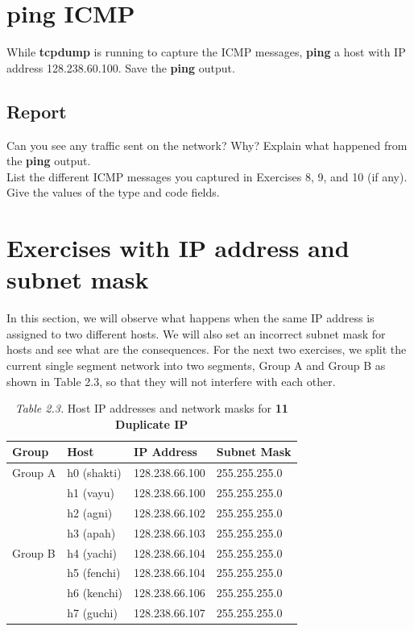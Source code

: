 \documentclass[10pt,a4paper]{article}
\numberwithin{equation}{section}
\numberwithin{figure}{section}
\numberwithin{table}{section}
\begin{document}
\section{ping ICMP}
    While \textbf{tcpdump} is running to capture the ICMP messages, \textbf{ping} a host with IP address 128.238.60.100. Save the \textbf{ping} output.
    \subsection*{Report}
    Can you see any traffic sent on the network? Why? Explain what happened from the \textbf{ping} output. \\
    List the different ICMP messages you captured in Exercises 8, 9, and 10 (if any). Give the values of the type and code fields.

\section*{Exercises with IP address and subnet mask}
    In this section, we will observe what happens when the same IP address is assigned to two different hosts.
    We will also set an incorrect subnet mask for hosts and see what are the consequences.
    For the next two exercises, we split the current single segment network into two segments, Group A and Group B as shown in Table 2.3, so that they will not interfere with each other.

    \begin{table}[H]
        \caption{\textit{Table 2.3.} Host IP addresses and network masks for \textbf{11 Duplicate IP}}
        \vspace{5pt}
        \centering
        \large
        \begin{tabular}{ l l l l }
            \hline \hline
            Group & Host & IP Address & Subnet Mask \\
            \hline 
            Group A & h0 (shakti) & 128.238.66.100 & 255.255.255.0 \\
                    & h1 (vayu) & 128.238.66.100 & 255.255.255.0 \\
                    & h2 (agni) & 128.238.66.102 & 255.255.255.0 \\
                    & h3 (apah) & 128.238.66.103 & 255.255.255.0 \\
                    \hline
            Group B & h4 (yachi) & 128.238.66.104 & 255.255.255.0 \\
                    & h5 (fenchi) & 128.238.66.104 & 255.255.255.0 \\
                    & h6 (kenchi) & 128.238.66.106 & 255.255.255.0 \\
                    & h7 (guchi) & 128.238.66.107 & 255.255.255.0 \\
            \hline \hline
            \end{tabular}
    \end{table}
\end{document}
